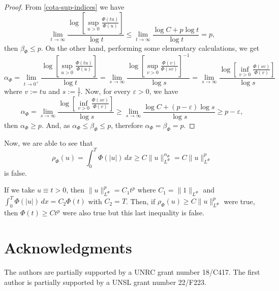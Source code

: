 \documentclass[twoside]{article}
\theoremstyle{remark}
\newcommand{\orlnor}{\|_{L^{\Phi}}}
\renewcommand{\leq}{\leqslant}
\begin{document}
\begin{proof}
From \eqref{cota-sup-indices} we have 
\[
\lim\limits_{t \to \infty} \frac{\log\left[\sup\limits_{u>0} \frac{\Phi(tu)}{\Phi(u)}\right]}{\log t}
\leq
\lim \limits_{t \to \infty} \frac{\log C+p\log t}{\log t}=p,
\]
then $\beta_{\Phi}\leq p$.
On the other hand, performing some elementary calculations, we get
\[
\alpha_{\Phi}=
\lim\limits_{t \to 0^+} \frac{\log\left[\sup\limits_{u>0} \frac{\Phi(tu)}{\Phi(u)}\right]}{\log t}=
\lim\limits_{s \to \infty} \frac{\log\left[\sup\limits_{v>0} \frac{\Phi(v)}{\Phi(sv)}\right]^{-1}}{\log s}=
\lim\limits_{s \to \infty} \frac{\log\left[\inf\limits_{v>0} \frac{\Phi(sv)}{\Phi(v)}\right]}{\log s}
\]
where $v:=tu$ and $s:=\frac{1}{t}$.
Now, for every $\varepsilon>0$, we have
\[
\alpha_{\Phi}=
\lim\limits_{s \to \infty} \frac{\log\left[\inf\limits_{v>0} \frac{\Phi(sv)}{\Phi(v)}\right]}{\log s}\geq
\lim\limits_{s \to \infty} \frac{\log C+(p-\varepsilon)\log s}{\log s}\geq p-\varepsilon,
\]
then $\alpha_{\Phi}\geq p$. And, as $\alpha_{\Phi}\leq \beta_{\Phi}\leq p$, therefore 
$\alpha_{\Phi}=\beta_{\Phi}=p$.
\end{proof}



Now, we are able to see that 
\[
\rho_{\Phi}(u)=\int_0^T \Phi(|u|)\,dx\geq C\|u\orlnor^{\alpha_{\Phi}}=C\|u\orlnor^p
\]
is false.

If we take $u\equiv t>0$, then $\|u\orlnor^p=C_1t^p$ where $C_1=\|1\orlnor$ and
$\int_0^T \Phi(|u|)\,dx=C_2\Phi(t)$ with $C_2=T$. 
Then, if $\rho_{\Phi}(u)\geq C\|u\orlnor^p$ were true, then $\Phi(t)\geq C t^p$ were also true but this
last inequality is false.
 

\section*{Acknowledgments}
The authors are partially supported by a UNRC grant number 18/C417. The first author is  partially supported by a  UNSL grant number 22/F223. 


  
 
\end{document}

